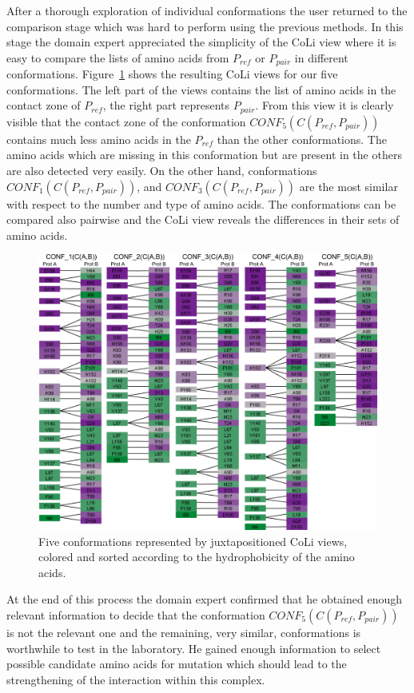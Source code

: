 \documentclass[journal]{vgtc}                %
\begin{document}
After a thorough exploration of individual conformations the user returned to the comparison stage which was hard to perform using the previous methods.
In this stage the domain expert appreciated the simplicity of the CoLi view where it is easy to compare the lists of amino acids from $P_{ref}$ or $P_{pair}$ in different conformations. 
Figure~\ref{fig:case3} shows the resulting CoLi views for our five conformations.
The left part of the views contains the list of amino acids in the contact zone of $P_{ref}$, the right part represents $P_{pair}$.
From this view it is clearly visible that the contact zone of the conformation $CONF_5(C(P_{ref},P_{pair}))$ contains much less amino acids in the $P_{ref}$ than the other conformations. 
The amino acids which are missing in this conformation but are present in the others are also detected very easily.
On the other hand, conformations $CONF_1(C(P_{ref},P_{pair}))$, and $CONF_3(C(P_{ref},P_{pair}))$ are the most similar with respect to the number and type of amino acids. 
The conformations can be compared also pairwise and the CoLi view reveals the differences in their sets of amino acids.

\begin{figure}[bt]
  \centering
  \includegraphics[width=0.9\linewidth]{case3.pdf}
  \caption{Five conformations represented by juxtapositioned CoLi views, colored and sorted according to the hydrophobicity of the amino acids.}
  \label{fig:case3}
\end{figure}

At the end of this process the domain expert confirmed that he obtained enough relevant information to decide that the conformation $CONF_5(C(P_{ref},P_{pair}))$ is not the relevant one and the remaining, very similar, conformations is worthwhile to test in the laboratory.
He gained enough information to select possible candidate amino acids for mutation which should lead to the strengthening of the interaction within this complex.
\end{document}
